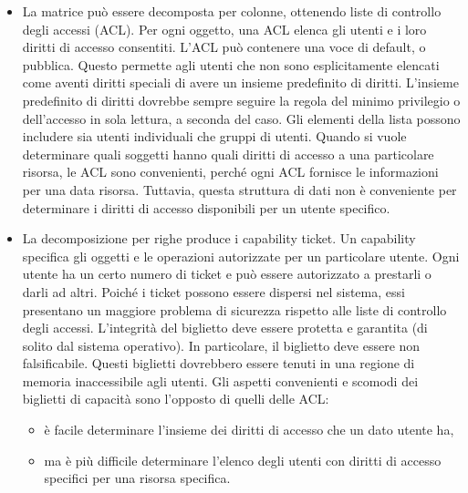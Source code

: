 \begin{itemize}
    \item La matrice può essere decomposta per colonne, ottenendo liste di controllo degli accessi (ACL). Per ogni oggetto, una ACL elenca gli utenti e i loro diritti di accesso consentiti. L'ACL può contenere una voce di default, o pubblica. Questo permette agli utenti che non sono esplicitamente elencati come aventi diritti speciali di avere un insieme predefinito di diritti. L'insieme predefinito di diritti dovrebbe sempre seguire la regola del minimo privilegio o dell'accesso in sola lettura, a seconda del caso. Gli elementi della lista possono includere sia utenti individuali che gruppi di utenti. Quando si vuole determinare quali soggetti hanno quali diritti di accesso a una particolare risorsa, le ACL sono convenienti, perché ogni ACL fornisce le informazioni per una data risorsa. Tuttavia, questa struttura di dati non è conveniente per determinare i diritti di accesso disponibili per un utente specifico.
    \item La decomposizione per righe produce i capability ticket. Un capability specifica gli oggetti e le operazioni autorizzate per un particolare utente. Ogni utente ha un certo numero di ticket e può essere autorizzato a prestarli o darli ad altri. Poiché i ticket possono essere dispersi nel sistema, essi presentano un maggiore problema di sicurezza rispetto alle liste di controllo degli accessi. L'integrità del biglietto deve essere protetta e garantita (di solito dal sistema operativo). In particolare, il biglietto deve essere non falsificabile. Questi biglietti dovrebbero essere tenuti in una regione di memoria inaccessibile agli utenti.  Gli aspetti convenienti e scomodi dei biglietti di capacità sono l'opposto di quelli delle ACL:
    \begin{itemize}
        \item è facile determinare l'insieme dei diritti di accesso che un dato utente ha,
        \item ma è più difficile determinare l'elenco degli utenti con diritti di accesso specifici per una risorsa specifica. 
    \end{itemize}
\end{itemize}